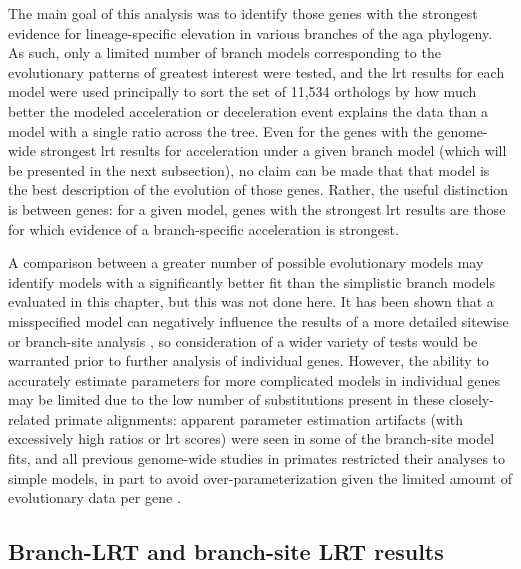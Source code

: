 The main goal of this analysis was to identify those genes with the
strongest evidence for lineage-specific elevation in various branches
of the \ac{aga} phylogeny. As such, only a limited number of branch
models corresponding to the evolutionary patterns of greatest interest
were tested, and the \ac{lrt} results for each model were used
principally to sort the set of 11,534 orthologs by how much better the
modeled \dnds acceleration or deceleration event explains the data
than a model with a single \dnds ratio across the tree. Even for the
genes with the genome-wide strongest \ac{lrt} results for \dnds
acceleration under a given branch model (which will be presented in
the next subsection), no claim can be made that that model is the best
description of the evolution of those genes. Rather, the useful
distinction is between genes: for a given model, genes with the
strongest \ac{lrt} results are those for which evidence of a
branch-specific \dnds acceleration is strongest.

A comparison between a greater number of possible evolutionary models
may identify models with a significantly better fit than the
simplistic branch models evaluated in this chapter, but this was not
done here. It has been shown that a misspecified model can negatively
influence the results of a more detailed sitewise or branch-site
analysis \citep{Pond2011}, so consideration of a wider variety of
tests would be warranted prior to further analysis of individual
genes. However, the ability to accurately estimate parameters for more
complicated models in individual genes may be limited due to the low
number of substitutions present in these closely-related primate
alignments: apparent parameter estimation artifacts (with excessively
high \dnds ratios or \ac{lrt} scores) were seen in some of the
branch-site model fits, and all previous genome-wide studies in
primates restricted their analyses to simple models, in part to avoid
over-parameterization given the limited amount of evolutionary data
per gene \citep{Clark2003,Nielsen2005}.


\subsection{Branch-LRT and branch-site LRT results}

